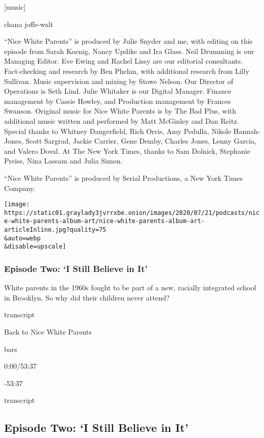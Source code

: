 {[}music{]}

chana joffe-walt

``Nice White Parents'' is produced by Julie Snyder and me, with editing
on this episode from Sarah Koenig, Nancy Updike and Ira Glass. Neil
Drumming is our Managing Editor. Eve Ewing and Rachel Lissy are our
editorial consultants. Fact-checking and research by Ben Phelan, with
additional research from Lilly Sullivan. Music supervision and mixing by
Stowe Nelson. Our Director of Operations is Seth Lind. Julie Whitaker is
our Digital Manager. Finance management by Cassie Howley, and Production
management by Frances Swanson. Original music for Nice White Parents is
by The Bad Plus, with additional music written and performed by Matt
McGinley and Dan Reitz. Special thanks to Whitney Dangerfield, Rich
Orris, Amy Pedulla, Nikole Hannah-Jones, Scott Sargrad, Jackie Carrier,
Gene Demby, Charles Jones, Lenny Garcia, and Valero Doval. At The New
York Times, thanks to Sam Dolnick, Stephanie Preiss, Nina Lassam and
Julia Simon.

``Nice White Parents'' is produced by Serial Productions, a New York
Times Company.

\texttt{[image: https://static01.graylady3jvrrxbe.onion/images/2020/07/21/podcasts/nice-white-parents-album-art/nice-white-parents-album-art-articleInline.jpg?quality=75\\\&auto=webp\\\&disable=upscale]}

\hypertarget{episode-two-i-still-believe-in-it}{%
\subsubsection{Episode Two: `I Still Believe in
It'}\label{episode-two-i-still-believe-in-it}}

White parents in the 1960s fought to be part of a new, racially
integrated school in Brooklyn. So why did their children never attend?

transcript

Back to Nice White Parents

bars

0:00/53:37

-53:37

transcript

\hypertarget{episode-two-i-still-believe-in-it-1}{%
\subsection{Episode Two: `I Still Believe in
It'}\label{episode-two-i-still-believe-in-it-1}}

